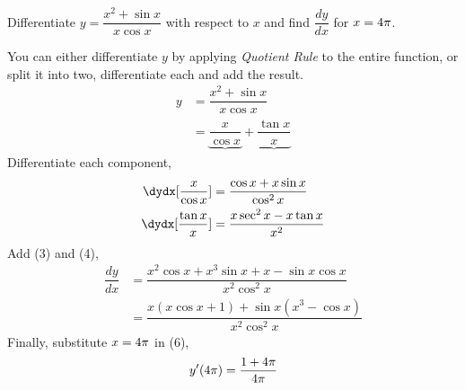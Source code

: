 

\question Differentiate $y=\dfrac{x^2+\sin x}{x\cos x}$ with respect to $x$
and find $\dfrac{dy}{dx}$ for $x=4\pi$.

\insertQR{}

\watchout

\begin{solution}
  You can either differentiate $y$ by applying \textit{Quotient Rule} to the
  entire function, or split it into two, differentiate each and add the
  result.
  \begin{align}
    y &= \dfrac{x^2+\sin x}{x\cos x} \\
      &= \underbrace{\dfrac{x}{\cos x}} + \underbrace{\dfrac{\tan x}{x}} 
  \end{align}
  Differentiate each component,
  \begin{align}
    \dydx[\dfrac{x}{\cos x}] &= \dfrac{\cos x + x\sin x}{\cos^2 x} \\
    \dydx[\dfrac{\tan x}{x}] &= \dfrac{x\sec^2 x - x\tan x}{x^2} 
  \end{align}
  Add (3) and (4),
  \begin{align}
    \dfrac{dy}{dx} &= \dfrac{x^2\cos x + x^3\sin x + x - \sin x\cos x}{x^2\cos^2 x} \\
                   &= \dfrac{x(x\cos x + 1) + \sin x(x^3 - \cos x)}{x^2\cos^2 x}
  \end{align}
  Finally, substitute $x=4\pi$ in (6),
  \begin{align}
    y'(4\pi) = \dfrac{1+4\pi}{4\pi}
  \end{align}
\end{solution}

